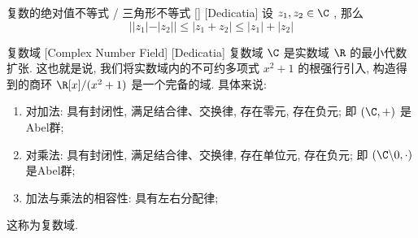 \documentclass[UTF8]{ctexart}
\begin{document}
\begin{ppt}
    [UUID]
    {复数的绝对值不等式 / 三角形不等式}
    []
    [Dedicatia]
    设 \( z_1,z_2\in\C \) , 那么
    \[||z_1|-|z_2||\leq|z_1+z_2|\leq|z_1|+|z_2|\]
\end{ppt}
\begin{dfn}
    [UUID]
    {复数域}
    [Complex Number Field]
    [Dedicatia]
    复数域 \( \C \) 是实数域 \( \R \) 的最小代数扩张. 这也就是说, 我们将实数域内的不可约多项式 \( x^2+1 \) 的根强行引入, 构造得到的商环 \( \R[x]/(x^2+1) \) 是一个完备的域. 具体来说: 
    \begin{enumerate}
        \item 对加法: 具有封闭性, 满足结合律、交换律, 存在零元, 存在负元; 即 \( (\C,+) \) 是Abel群; 
        \item 对乘法: 具有封闭性, 满足结合律、交换律, 存在单位元, 存在负元; 即 \( (\C\backslash 0,\cdot) \) 是Abel群; 
        \item 加法与乘法的相容性: 具有左右分配律; 
    \end{enumerate}
    这称为复数域. 
\end{dfn}
\end{document}
